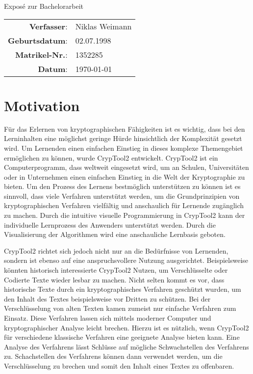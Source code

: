 \documentclass[fontsize=11pt, paper=a4, parskip=half]{scrartcl}
\begin{document}
\begin{center}
	{\Large{Exposé zur Bachelorarbeit}} \vspace{0.5cm}
\end{center}
\begin{center}
  \begin{tabular}{rl}
    \textbf{Verfasser}: & Niklas Weimann \\
    \textbf{Geburtsdatum}: & 02.07.1998 \\
    \textbf{Matrikel-Nr.}: & 1352285 \\
    \textbf{Datum}: & \today \\
  \end{tabular}
\end{center}


\section{Motivation}
Für das Erlernen von kryptographischen Fähigkeiten ist es wichtig, dass bei den Lerninhalten eine möglichst geringe Hürde hinsichtlich der Komplexität gesetzt wird. Um Lernenden einen einfachen Einstieg in dieses komplexe Themengebiet ermöglichen zu können, wurde CrypTool2 entwickelt. CrypTool2 ist ein Computerprogramm, dass weltweit eingesetzt wird, um an Schulen, Universitäten oder in Unternehmen einen einfachen Einstieg in die Welt der Kryptographie zu bieten. Um den Prozess des Lernens bestmöglich unterstützen zu können ist es sinnvoll, dass viele Verfahren unterstützt werden, um die Grundprinzipien von kryptographischen Verfahren vielfältig und anschaulich für Lernende zugänglich zu machen. Durch die intuitive visuelle Programmierung in CrypTool2 kann der individuelle Lernprozess des Anwenders unterstützt werden. Durch die Visualisierung der Algorithmen wird eine anschauliche Lernbasis geboten.

CrypTool2 richtet sich jedoch nicht nur an die Bedürfnisse von Lernenden, sondern ist ebenso auf eine anspruchsvollere Nutzung ausgerichtet. Beispielsweise könnten historisch interessierte CrypTool2 Nutzen, um Verschlüsselte oder Codierte Texte wieder lesbar zu machen. Nicht selten kommt es vor, dass historische Texte durch ein kryptographisches Verfahren geschützt wurden, um den Inhalt des Textes beispielsweise vor Dritten zu schützen. Bei der Verschlüsselung von alten Texten kamen zumeist nur einfache Verfahren zum Einsatz. Diese Verfahren lassen sich mittels moderner Computer und kryptographischer Analyse leicht brechen. Hierzu ist es nützlich, wenn CrypTool2 für verschiedene klassische Verfahren eine geeignete Analyse bieten kann. Eine Analyse des Verfahrens lässt Schlüsse auf mögliche Schwachstellen des Verfahrens zu. Schachstellen des Verfahrens können dann verwendet werden, um die Verschlüsselung zu brechen und somit den Inhalt eines Textes zu offenbaren.
\end{document}
